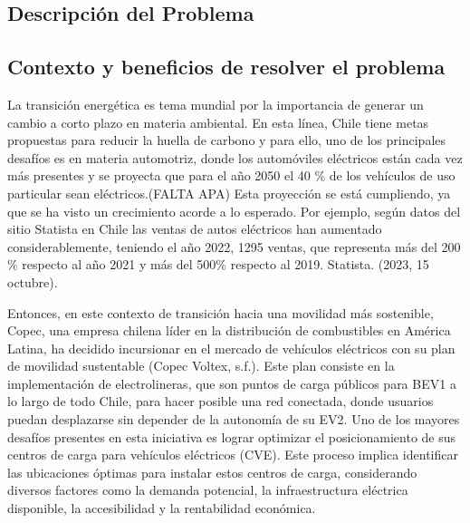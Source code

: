 \documentclass[letterpaper]{article}
\begin{document}
	\newpage
	\begin{flushleft}
		
		\section{Descripción del Problema}
		\subsection{Contexto y beneficios de resolver el problema}
		La transición energética es tema mundial por la importancia de generar un cambio a corto plazo en materia ambiental. En esta línea, Chile tiene metas propuestas para reducir la huella de carbono y para ello, uno de los principales desafíos es en materia automotriz, donde los automóviles eléctricos están cada vez más presentes y se proyecta que para el año 2050 el 40 \% de los vehículos de uso particular sean eléctricos.(FALTA APA)
		Esta proyección se está cumpliendo, ya que se ha visto un crecimiento acorde a lo esperado. Por ejemplo, según datos del sitio Statista en Chile las ventas de autos eléctricos han aumentado considerablemente, teniendo el año 2022, 1295 ventas, que representa más del 200 \% respecto al año 2021 y más del 500\% respecto al 2019. Statista. (2023, 15 octubre). 


		Entonces, en este contexto de transición hacia una movilidad más sostenible, Copec, una empresa chilena líder en la distribución de combustibles en América Latina, ha decidido incursionar en el mercado de vehículos eléctricos con su plan de movilidad sustentable (Copec Voltex, s.f.). Este plan consiste en la implementación de electrolineras, que son puntos de carga públicos para BEV1 a lo largo de todo Chile, para hacer posible una red conectada, donde usuarios puedan desplazarse sin depender de la autonomía de su EV2. 
		Uno de los mayores desafíos presentes en esta iniciativa es lograr optimizar el posicionamiento de sus centros de carga para vehículos eléctricos (CVE). Este proceso implica identificar las ubicaciones óptimas para instalar estos centros de carga, considerando diversos factores como la demanda potencial, la infraestructura eléctrica disponible, la accesibilidad y la rentabilidad económica.


\end{flushleft}
\end{document}
